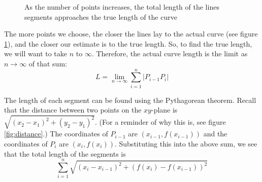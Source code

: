 \begin{figure}[H]
\centering
    \caption{As the number of points increases, the total length of the lines segments approaches the true length of the curve}
    \label{fig:points}
\end{figure}

The more points we choose, the closer the lines lay to the actual 
curve (see figure \ref{fig:points}), and the closer our estimate is 
to the true length. So, to find the true length, we will want to take 
$n$ to $\infty$. Therefore, the actual curve length is the limit as 
$n \to \infty$ of that sum:
$$L = \lim_{n \to \infty}\sum_{i=1}^n |P_{i-1}P_i|$$

The length of each segment can be found using the Pythagorean theorem. 
Recall that the distance between two points on the $xy$-plane is 
$\sqrt{(x_2 - x_1)^2 + (y_2 - y_1)^2}$. (For a reminder of why this 
is, see figure \ref{fig:distance}.) The coordinates of $P_{i-1}$ are 
$(x_{i-1}, f(x_{i-1}))$ and the coordinates of $P_i$ are $(x_i, 
f(x_i))$. Substituting this into the above sum, we see that the total 
length of the segments is 
$$\sum_{i=1}^n \sqrt{(x_i - x_{i-1})^2 + (f(x_i) - f(x_{i-1}))^2}$$

